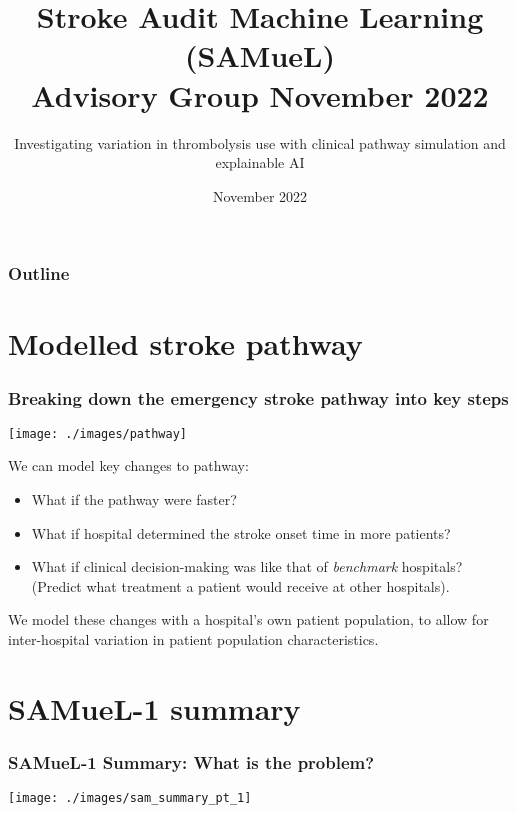 \documentclass[xcolor={usenames,dvipsnames}]{beamer}
\title{Stroke Audit Machine Learning (SAMueL) \\ Advisory Group November 2022}
\subtitle{Investigating variation in thrombolysis use with clinical pathway simulation and explainable AI}
\date{November 2022}
\begin{document}

\begin{frame}
\titlepage

\end{frame}



\begin{frame}
\frametitle{Outline}
\tableofcontents
\end{frame}

\section{Modelled stroke pathway}


\begin{frame}
\frametitle{Breaking down the emergency stroke pathway into key steps}
\begin{center}
\texttt{[image: ./images/pathway]}
\end{center}
We can model key changes to pathway:
\begin{small}
\begin{itemize}
    \item What if the pathway were faster?
    \item What if hospital determined the stroke onset time in more patients?
    \item What if clinical decision-making was like that of \emph{benchmark} hospitals? (Predict what treatment a patient would receive at other hospitals).
\end{itemize}
\end{small}
\footnotesize{We model these changes with a hospital's own patient population, to allow for inter-hospital variation in patient population characteristics.}
\end{frame}

\section{SAMueL-1 summary}



\begin{frame}
\frametitle{SAMueL-1 Summary: What is the problem?}
\begin{center}
\texttt{[image: ./images/sam\_summary\_pt\_1]}
\end{center}
\end{frame}
\end{document}
